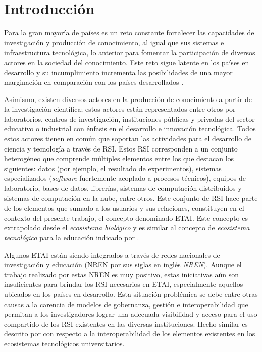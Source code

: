 {} %
\thispagestyle{fancy}
\chapter*{Introducción}

Para la gran mayoría de países es un reto constante fortalecer las capacidades de investigación y producción de conocimiento, al igual que sus sistemas e infraestructura tecnológica, lo anterior para fomentar la participación de diversos actores en la sociedad del conocimiento. Este reto sigue latente en los países en desarrollo y su incumplimiento incrementa las posibilidades de una mayor marginación en comparación con los países desarrollados \parencite{Bautista2019}.

Asimismo, existen diversos actores en la producción de conocimiento a partir de la investigación científica; estos actores están representados entre otros por laboratorios, centros de investigación, instituciones públicas y privadas del sector educativo o industrial con énfasis en el desarrollo e innovación tecnológica. Todos estos actores tienen en común que soportan las actividades para el desarrollo de ciencia y tecnología a través de \acrfull{RSI}. Estos \acrshort{RSI} corresponden a un conjunto heterogéneo que comprende múltiples elementos entre los que destacan los siguientes: datos (por ejemplo, el resultado de experimentos), sistemas especializados (\textit{software} fuertemente acoplado a procesos técnicos), equipos de laboratorio, bases de datos, librerías, sistemas de computación distribuidos y sistemas de computación en la nube, entre otros. Este conjunto de \acrshort{RSI} hace parte de los elementos que sumado a los usuarios y sus relaciones, constituyen en el contexto del presente trabajo, el concepto denominado \acrfull{ETAI}.  Este concepto es extrapolado desde el \textit{ecosistema biológico} y es similar al concepto de \textit{ecosistema tecnológico} para la educación indicado por \textcite{Garcia-Holgado2018}.

Algunos \acrshort{ETAI} están siendo integrados a través de redes nacionales de investigación y educación (\acrshort{NREN} por sus siglas en inglés \textit{\acrlong{NREN}}). Aunque el trabajo realizado por estas \acrshort{NREN} es muy positivo, estas iniciativas aún son insuficientes para brindar los \acrshort{RSI} necesarios en \acrshort{ETAI}, especialmente aquellos ubicados en los países en desarrollo. Esta situación problémica se debe entre otras causas a la carencia de modelos de gobernanza, gestión e interoperabilidad que permitan a los investigadores lograr una adecuada visibilidad y acceso para el uso compartido de los \acrshort{RSI} existentes en las diversas instituciones. Hecho similar es descrito por \textcite{Garcia-Penalvo2018} con respecto a la interoperabilidad de los elementos existentes en los ecosistemas tecnológicos universitarios.

